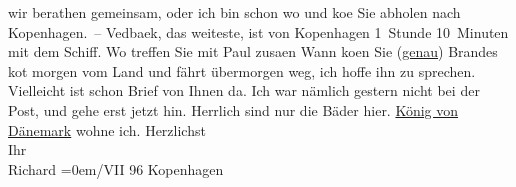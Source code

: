 \begin{ledgroupsized}[t]{13cm}
               wir berathen gemeinsam, oder ich bin schon wo und ko{\geminationm}e
               Sie abholen nach Kopenhagen. –\pend
           \pstart
           {\pb}Vedbaek, das weiteste, ist von Kopenhagen 1 Stunde 10 Minuten mit dem Schiff.
               Wo treffen Sie mit Paul zusa{\geminationm}en\pend
           \pstart
           Wann ko{\geminationm}en Sie (\uline{genau})\pend
           \pstart
           Brandes ko{\geminationm}t
               morgen vom Land und fährt übermorgen weg, ich hoffe ihn zu sprechen. Vielleicht ist
               schon Brief von Ihnen da. {\pb}Ich war
               nämlich gestern nicht bei der Post, und gehe erst jetzt hin. Herrlich sind nur die
               Bäder hier. \uline{König von Dänemark} wohne ich.\pend
           \pstart
           Herzlichst{\\[\baselineskip]}Ihr{\\[\baselineskip]}\spacefill\mbox{Richard}\pend
           \leftskip=0em{}/VII 96{ }Kopenhagen\pend
           
         
         \endnumbering{}\end{ledgroupsized}  \newcommand{\dateiname}{L00570}\newcommand{\titel}{Richard Beer-Hofmann an Arthur Schnitzler, 28. 7. 1896}\newcommand{\editorInnen}{Martin Anton Müller und Gerd-Hermann Susen}
      